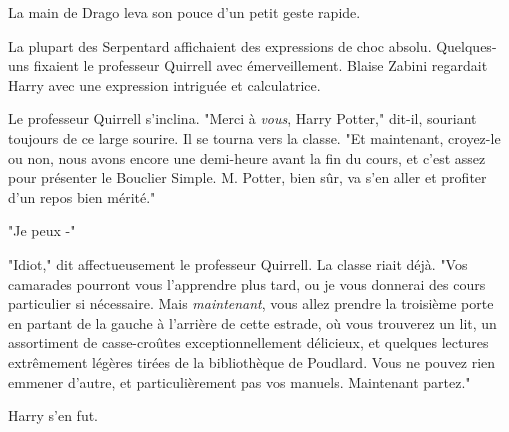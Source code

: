 La main de Drago leva son pouce d'un petit geste rapide.

La plupart des Serpentard affichaient des expressions de choc absolu. Quelques-uns fixaient le professeur Quirrell avec émerveillement. Blaise Zabini regardait Harry avec une expression intriguée et calculatrice.

Le professeur Quirrell s'inclina. "Merci à \emph{vous}, Harry Potter," dit-il, souriant toujours de ce large sourire. Il se tourna vers la classe. "Et maintenant, croyez-le ou non, nous avons encore une demi-heure avant la fin du cours, et c'est assez pour présenter le Bouclier Simple. M. Potter, bien sûr, va s'en aller et profiter d'un repos bien mérité."

"Je peux -"

"Idiot," dit affectueusement le professeur Quirrell. La classe riait déjà. "Vos camarades pourront vous l'apprendre plus tard, ou je vous donnerai des cours particulier si nécessaire. Mais \emph{maintenant}, vous allez prendre la troisième porte en partant de la gauche à l'arrière de cette estrade, où vous trouverez un lit, un assortiment de casse-croûtes exceptionnellement délicieux, et quelques lectures extrêmement légères tirées de la bibliothèque de Poudlard. Vous ne pouvez rien emmener d'autre, et particulièrement pas vos manuels. Maintenant partez."

Harry s'en fut. 

